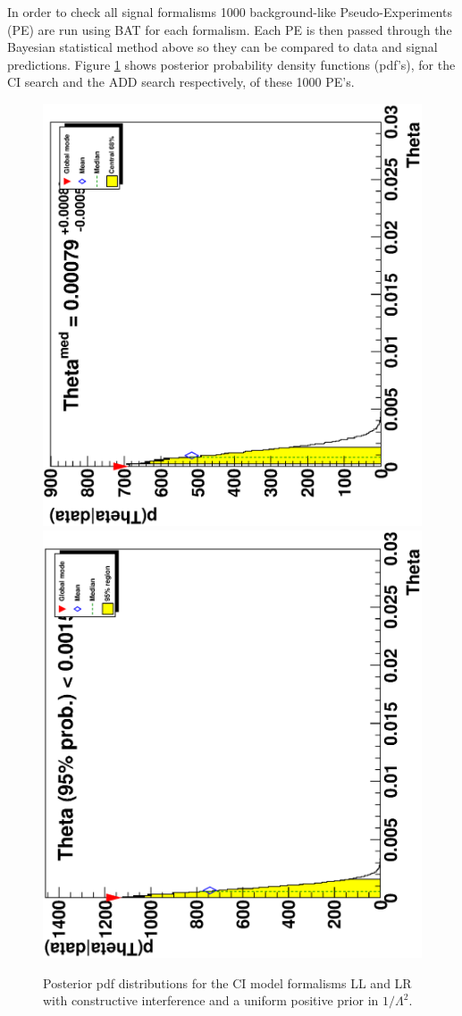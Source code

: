     In order to check all signal formalisms 1000 background-like Pseudo-Experiments (PE) are run using BAT for each formalism. Each PE is then passed through the Bayesian statistical method above so they can be compared to data and signal predictions. Figure \ref{fig:pdf_CI_main} shows posterior probability density functions (pdf's), for the CI search and the ADD search respectively, of these 1000 PE's.

    \begin{figure}[h]
        \begin{center}
            \vspace{0.2em}\includegraphics[width=0.45\linewidth,natwidth=610,natheight=642,angle=-90]{images/ee__LL_minus_L2/post.ps}
            \includegraphics[width=0.45\linewidth,natwidth=610,natheight=642,angle=-90]{images/ee__LR_minus_L2/post.ps}
        \end{center}
        \vspace{-4.0em}
       \caption{Posterior pdf distributions for the CI model formalisms LL and LR with constructive interference and a uniform positive prior in $1/\Lambda^{2}$.}
       \label{fig:pdf_CI_main}
    \end{figure}




